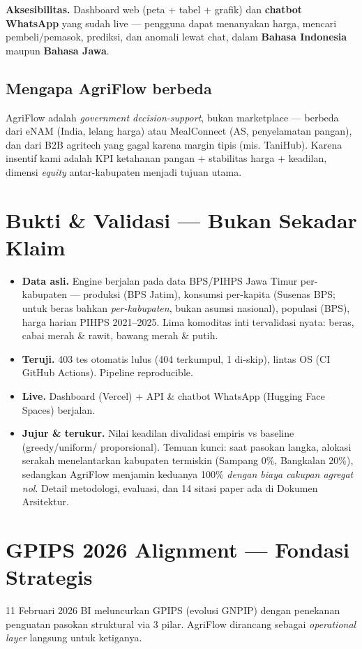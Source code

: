 \documentclass[11pt,a4paper]{article}
\begin{document}
\textbf{Aksesibilitas.} Dashboard web (peta + tabel + grafik) dan \textbf{chatbot WhatsApp} yang
sudah live --- pengguna dapat menanyakan harga, mencari pembeli/pemasok, prediksi, dan anomali
lewat chat, dalam \textbf{Bahasa Indonesia} maupun \textbf{Bahasa Jawa}.

\subsection{Mengapa AgriFlow berbeda}
AgriFlow adalah \emph{government decision-support}, bukan marketplace --- berbeda dari eNAM
(India, lelang harga) atau MealConnect (AS, penyelamatan pangan), dan dari B2B agritech yang
gagal karena margin tipis (mis. TaniHub). Karena insentif kami adalah KPI ketahanan pangan +
stabilitas harga + keadilan, dimensi \emph{equity} antar-kabupaten menjadi tujuan utama.

\section{Bukti \& Validasi --- Bukan Sekadar Klaim}
\begin{itemize}
  \item \textbf{Data asli.} Engine berjalan pada data BPS/PIHPS Jawa Timur per-kabupaten ---
        produksi (BPS Jatim), konsumsi per-kapita (Susenas BPS; untuk beras bahkan
        \emph{per-kabupaten}, bukan asumsi nasional), populasi (BPS), harga harian PIHPS
        2021--2025. Lima komoditas inti tervalidasi nyata: beras, cabai merah \& rawit, bawang
        merah \& putih.
  \item \textbf{Teruji.} 403 tes otomatis lulus (404 terkumpul, 1 di-skip), lintas OS (CI GitHub Actions). Pipeline
        reproducible.
  \item \textbf{Live.} Dashboard (Vercel) + API \& chatbot WhatsApp (Hugging Face Spaces) berjalan.
  \item \textbf{Jujur \& terukur.} Nilai keadilan divalidasi empiris vs baseline (greedy/uniform/
        proporsional). Temuan kunci: saat pasokan langka, alokasi serakah menelantarkan kabupaten
        termiskin (Sampang 0\%, Bangkalan 20\%), sedangkan AgriFlow menjamin keduanya 100\%
        \emph{dengan biaya cakupan agregat nol}. Detail metodologi, evaluasi, dan 14 sitasi paper
        ada di Dokumen Arsitektur.
\end{itemize}

\section{GPIPS 2026 Alignment --- Fondasi Strategis}
11 Februari 2026 BI meluncurkan GPIPS (evolusi GNPIP) dengan penekanan penguatan pasokan
struktural via 3 pilar. AgriFlow dirancang sebagai \emph{operational layer} langsung untuk
ketiganya.
\end{document}
